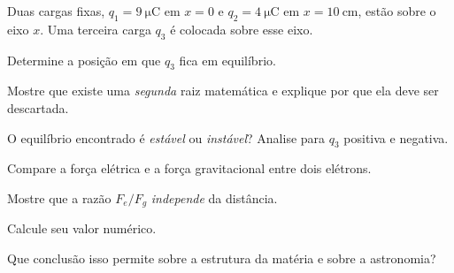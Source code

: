 \begin{questao}[3]{}

Duas cargas fixas, $q_1 = \SI{+9}{\micro\coulomb}$ em $x=0$ e
$q_2 = \SI{+4}{\micro\coulomb}$ em $x = \SI{10}{\centi\meter}$, estão sobre o eixo
$x$. Uma terceira carga $q_3$ é colocada sobre esse eixo.
\begin{itensq}
\item Determine a posição em que $q_3$ fica em equilíbrio.
\item Mostre que existe uma \emph{segunda} raiz matemática e explique por que ela
      deve ser descartada.
\item O equilíbrio encontrado é \emph{estável} ou \emph{instável}? Analise para
      $q_3$ positiva e negativa.
\end{itensq}


\end{questao}
\begin{questao}[3]{}

Compare a força elétrica e a força gravitacional entre dois elétrons.
\begin{itensq}
\item Mostre que a razão $F_e/F_g$ \emph{independe} da distância.
\item Calcule seu valor numérico.
\item Que conclusão isso permite sobre a estrutura da matéria e sobre a
      astronomia?
\end{itensq}


\end{questao}
